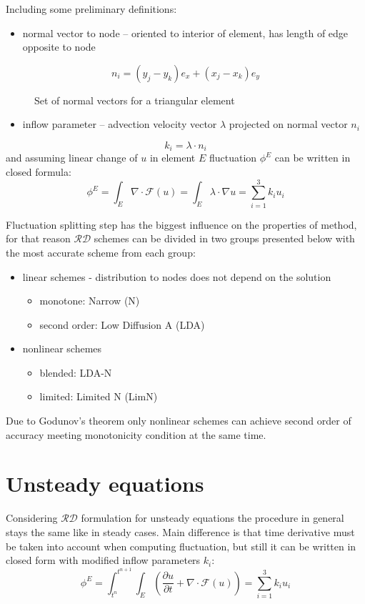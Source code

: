 \documentclass[plainboxedsections, 17pt, b1]{sciposter}
\newcommand{\fracpd}[2]{\frac{\partial #1}{\partial #2}}
\newcommand{\rd}{$\mathcal{RD}$}
\begin{document}
\begin{multicols}{3}
	Including some preliminary definitions:
	\begin{itemize}
		\item normal vector to node -- oriented to interior of element, has length of edge opposite to node\\
	\end{itemize}
		\[ n_i = (y_j-y_k) e_x + (x_j-x_k)  e_y  \]
		\begin{figure}%
			\centering
			\def\svgwidth{0.3\columnwidth}
			
			\caption{Set of normal vectors for a triangular element}
		\end{figure}
		\begin{itemize}
			\item inflow parameter -- advection velocity vector $\lambda$ projected on normal vector $n_i$
		\end{itemize}
			\[ k_i = \lambda \cdot n_i \]
	and assuming linear change of $u$ in element $E$ fluctuation $\phi^E$ can be written in closed formula:
	\[ \phi^E = \int_E \nabla \cdot \mathcal{F}(u) = \int_E \lambda \cdot \nabla u = \sum_{i=1}^3 k_i u_i 	\]
	
	Fluctuation splitting step has the biggest influence on the properties of method, for that reason \rd{} schemes can be divided in two groups presented below with the most accurate scheme from each group:
	\begin{itemize}
		\item linear schemes - distribution to nodes does not depend on the solution
			\begin{itemize}
				\item monotone: Narrow (N)
				\item second order: Low Diffusion A (LDA)
			\end{itemize}
		\item nonlinear schemes
			\begin{itemize}
				\item blended: LDA-N
				\item limited: Limited N (LimN)
			\end{itemize}
	\end{itemize}
	
	Due to Godunov's theorem only nonlinear schemes can achieve second order of accuracy meeting monotonicity condition at the same time. 
	
\section{Unsteady equations}
	Considering \rd{} formulation for unsteady equations the procedure in general stays the same like in steady cases. 
	Main difference is that time derivative must be taken into account when computing fluctuation, but still it can be written in closed form with modified inflow parameters $k_i$:
	\[ \phi^E = \int_{t^n}^{t^{n+1}} \int_E \left( \fracpd{u}{t} + \nabla \cdot \mathcal{F}(u) \right) = \sum_{i=1}^3 k_i u_i \]



\end{multicols}
\end{document}

